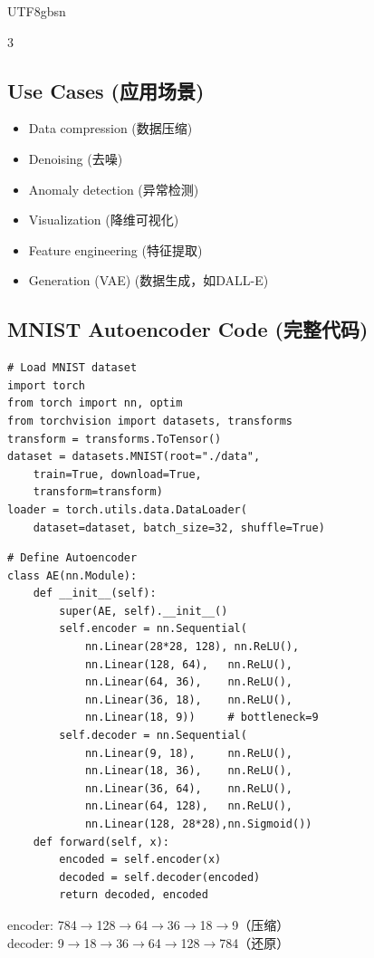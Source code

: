 \documentclass[9pt,landscape,a4paper]{article}
\newcommand{\zhint}[1]{{\scriptsize\color{gray!70!black}#1}}
\begin{document}
\begin{CJK}{UTF8}{gbsn}
\begin{multicols}{3}
\subsection{Use Cases \zhint{(应用场景)}}
\begin{itemize}[leftmargin=*, nosep, itemsep=0pt]
    \item Data compression \zhint{(数据压缩)}
    \item Denoising \zhint{(去噪)}
    \item Anomaly detection \zhint{(异常检测)}
    \item Visualization \zhint{(降维可视化)}
    \item Feature engineering \zhint{(特征提取)}
    \item Generation (VAE) \zhint{(数据生成，如DALL-E)}
\end{itemize}

\subsection{MNIST Autoencoder Code \zhint{(完整代码)}}

\begin{lstlisting}
# Load MNIST dataset
import torch
from torch import nn, optim
from torchvision import datasets, transforms
transform = transforms.ToTensor()
dataset = datasets.MNIST(root="./data",
    train=True, download=True,
    transform=transform)
loader = torch.utils.data.DataLoader(
    dataset=dataset, batch_size=32, shuffle=True)
\end{lstlisting}

\begin{lstlisting}
# Define Autoencoder
class AE(nn.Module):
    def __init__(self):
        super(AE, self).__init__()
        self.encoder = nn.Sequential(
            nn.Linear(28*28, 128), nn.ReLU(),
            nn.Linear(128, 64),   nn.ReLU(),
            nn.Linear(64, 36),    nn.ReLU(),
            nn.Linear(36, 18),    nn.ReLU(),
            nn.Linear(18, 9))     # bottleneck=9
        self.decoder = nn.Sequential(
            nn.Linear(9, 18),     nn.ReLU(),
            nn.Linear(18, 36),    nn.ReLU(),
            nn.Linear(36, 64),    nn.ReLU(),
            nn.Linear(64, 128),   nn.ReLU(),
            nn.Linear(128, 28*28),nn.Sigmoid())
    def forward(self, x):
        encoded = self.encoder(x)
        decoded = self.decoder(encoded)
        return decoded, encoded
\end{lstlisting}
\zhint{encoder: 784$\to$128$\to$64$\to$36$\to$18$\to$9（压缩）}\\
\zhint{decoder: 9$\to$18$\to$36$\to$64$\to$128$\to$784（还原）}


\end{multicols}
\end{CJK}
\end{document}
